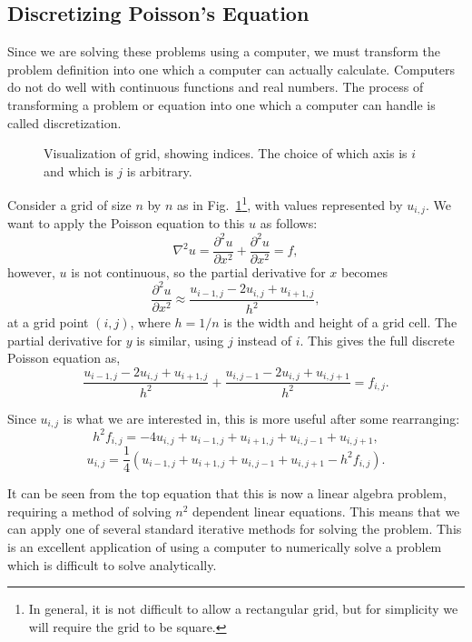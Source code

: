 \subsection{Discretizing Poisson's Equation}

Since we are solving these problems using a computer, we must transform the problem definition into one which a computer
can actually calculate. Computers do not do well with continuous functions and real numbers. The process of transforming
a problem or equation into one which a computer can handle is called discretization.

\begin{figure}[htb]
	\centering
	
	\caption[Visualization of grid, showing indices]{Visualization of grid, showing indices. The choice of which axis is $i$ and which is $j$ is arbitrary.}
\label{grid}
\end{figure}

Consider a grid of size $n$ by $n$ as in Fig.~\ref{grid}\footnote{In general, it is not difficult to allow a rectangular grid, but for simplicity
we will require the grid to be square.}, with values represented by $u_{i,j}$. We want to apply the Poisson equation to
this $u$ as follows:
$$\nabla^2 u = \frac{\partial^2 u}{\partial x^2} + \frac{\partial^2 u}{\partial x^2} = f,$$
however, $u$ is not continuous, so the partial derivative for $x$ becomes
$$\frac{\partial^2 u}{\partial x^2} \approx \frac{u_{i-1,j} - 2 u_{i,j} + u_{i+1,j}}{h^2},$$
at a grid point $(i,j)$, where $h = 1 / n$ is the width and height of a grid cell. The partial derivative for $y$ is similar, using $j$ instead of $i$.
This gives the full discrete Poisson equation as\cite{poisson-relax}\cite{myths},
$$\frac{u_{i-1,j} - 2 u_{i,j} + u_{i+1,j}}{h^2} + \frac{u_{i,j-1} - 2 u_{i,j} + u_{i,j+1}}{h^2} = f_{i,j}.$$

Since $u_{i,j}$ is what we are interested in, this is more useful after some rearranging:
$$h^2f_{i,j} = -4u_{i,j} + u_{i-1,j} + u_{i+1,j} + u_{i,j-1} + u_{i,j+1},$$
\begin{equation} \label{eq:poisson}
u_{i,j} = \frac{1}{4}(u_{i-1,j} + u_{i+1,j} + u_{i,j-1} + u_{i,j+1} - h^2f_{i,j}).
\end{equation}

It can be seen from the top equation that this is now a linear algebra problem, requiring a method of solving
$n^2$ dependent linear equations. This means that we can apply one of several standard iterative methods
for solving the problem. This is an excellent application of using a computer to numerically solve a problem
	which is difficult to solve analytically.


